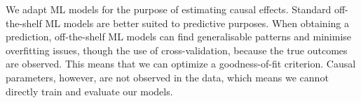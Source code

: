 \documentclass[12pt, a4paper]{article}
\begin{document}
%
%
%

We adapt ML models for the purpose of estimating causal effects. Standard off-the-shelf ML models are better suited to predictive purposes. When obtaining a prediction, off-the-shelf ML models can find generalisable patterns and minimise overfitting issues, though the use of cross-validation, because the true outcomes are observed. This means that we can optimize a goodness-of-fit criterion. Causal parameters, however, are not observed in the data, which means we cannot directly train and evaluate our models. 
\end{document}
